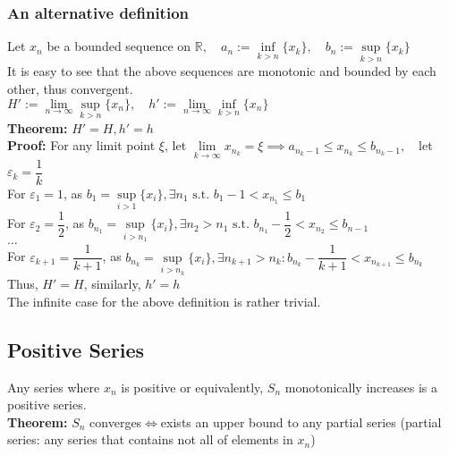 \documentclass{article}
\newcommand{\st}{\mbox{ s.t. }}
\newcommand{\0}{{\bf{0}}}
\begin{document}
\subsubsection{An alternative definition}
Let $x_n$ be a bounded sequence on $\mathbb{R},\quad a_n:=\inf\limits_{k>n}\{x_k\},\quad b_n:=\sup\limits_{k>n}\{x_k\}$\\
It is easy to see that the above sequences are monotonic and bounded by each other, thus convergent.\\
$H':=\lim\limits_{n\to\infty}\sup\limits_{k>n}\{x_n\},\quad h':=\lim\limits_{n\to\infty}\inf\limits_{k>n}\{x_n\}$\\
\textbf{Theorem: }$H'=H,h'=h$\\
\textbf{Proof:} For any limit point $\xi$, let $\lim\limits_{k\to\infty}x_{n_k}=\xi\implies a_{n_k-1}\le x_{n_k}\le b_{n_k-1},\quad$let $\varepsilon_k=\dfrac{1}{k}$\\
For $\varepsilon_1=1$, as $b_1=\sup\limits_{i>1}\{x_i\},\exists n_1\st b_1-1<x_{n_1}\le b_1$\\
For $\varepsilon_2=\dfrac{1}{2}$, as $b_{n_1}=\sup\limits_{i>n_1}\{x_i\},\exists n_2>n_1\st b_{n_1}-\dfrac{1}{2}<x_{n_2}\le b_{n-1}$\\
$\dots$\\
For $\varepsilon_{k+1}=\dfrac{1}{k+1}$, as $b_{n_k}=\sup\limits_{i>n_k}\{x_i\},\exists n_{k+1}>n_k:b_{n_k}-\dfrac{1}{k+1}<x_{n_{k+1}}\le b_{n_k}$\\
Thus, $H'=H$, similarly, $h'=h$\\
The infinite case for the above definition is rather trivial.
\subsection{Positive Series}
Any series where $x_n$ is positive or equivalently, $S_n$ monotonically increases is a positive series.\\
\textbf{Theorem:} $S_n$ converges$\iff$exists an upper bound to any partial series (partial series: any series that contains not all of elements in $x_n$)
\end{document}
